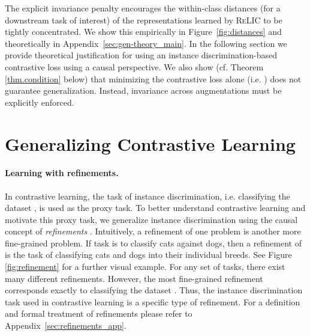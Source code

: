 \documentclass{article}
\newcommand{\relic}{\textsc{ReLIC}}
\begin{document}
The explicit invariance penalty encourages the within-class distances (for a downstream task of interest) of the representations learned by \relic{} to be tightly concentrated. We show this empirically in Figure~\ref{fig:distances} and theoretically in Appendix~\ref{sec:gen-theory_main}. 
In the following section we provide theoretical justification for using an instance discrimination-based contrastive loss using a causal perspective. 
We also show (cf. Theorem \ref{thm.condition} below) that minimizing the contrastive loss alone (i.e. ) does not guarantee generalization.
Instead, invariance across augmentations must be explicitly enforced. 
 \section{Generalizing Contrastive Learning}
\label{sec:method}

\paragraph{Learning with refinements.} \label{sec:refinements}
In contrastive learning, the task of instance discrimination, i.e. classifying the dataset , is used as the proxy task.
To better understand contrastive learning and motivate this proxy task, we generalize instance discrimination using the causal concept of \emph{refinements} \citep{chalupka2014visual}.
Intuitively, a refinement of one problem is another more fine-grained problem.
If task  is to classify cats against dogs, then a refinement of  is the task of classifying cats and dogs into their individual breeds.
See Figure \ref{fig:refinement} for a further visual example. 
 For any set of tasks, there exist many different refinements. 
However, the most fine-grained refinement corresponds exactly to classifying the dataset .
Thus, the instance discrimination task used in contrastive learning is a specific type of refinement.
For a definition and formal treatment of refinements please refer to Appendix~\ref{sec:refinements_app}.
\end{document}
